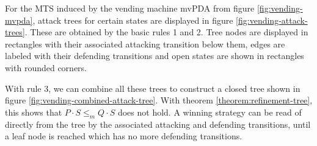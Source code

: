 \begin{example}
  For the MTS induced by the vending machine mvPDA from figure \ref{fig:vending-mvpda},
  attack trees for certain states are displayed in figure \ref{fig:vending-attack-trees}.
  These are obtained by the basic rules 1 and 2.
  Tree nodes are displayed in rectangles with their associated attacking transition
  below them, edges are labeled with their defending transitions and
  open states are shown in rectangles with rounded corners.

  With rule 3, we can combine all these trees to construct 
  a closed tree shown in figure
  \ref{fig:vending-combined-attack-tree}.
  With theorem \ref{theorem:refinement-tree}, this shows that
  $P⋅S ≤_m Q⋅S$ does not hold. A winning strategy 
  can be read of directly from the tree by the associated
  attacking and defending transitions, until a leaf node
  is reached which has no more defending transitions.
\end{example}

